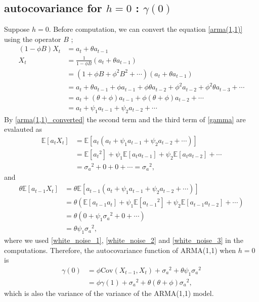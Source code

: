 \documentclass{article}
\newcommand\arma{\ensuremath{\text{ARMA}}}
\newcommand\cov{\ensuremath{\text{Cov}}}
\begin{document}
%
\subsection{autocovariance for \(h=0\) : \(\gamma(0)\)}\label{h0}
Suppose \(h=0\).
Before computation, we can convert the equation \eqref{arma(1,1)} using the operator \(B\) ; 
\begin{equation}\label{arma(1,1)_converted}
\begin{aligned}
(1-\phi B)X_t&=a_t+\theta a_{t-1}\\
X_t&=\frac1{1-\phi B}(a_t+\theta a_{t-1})\\
&=(1+\phi B+\phi^2B^2+\cdots)(a_t+\theta a_{t-1})\\
&=a_t+\theta a_{t-1}+\phi a_{t-1}+\phi\theta a_{t-2}+\phi^2a_{t-2}+\phi^2\theta a_{t-3}+\cdots\\
&=a_t+(\theta+\phi)a_{t-1}+\phi(\theta+\phi)a_{t-2}+\cdots\\
&=a_t+\psi_1a_{t-1}+\psi_2a_{t-2}+\cdots
\end{aligned}
\end{equation}
By \eqref{arma(1,1)_converted} the second term and the third term of \eqref{gamma} are evalauted as
\begin{align*}
\mathbb E[a_tX_t]
&=\mathbb E[a_t(a_t+\psi_1a_{t-1}+\psi_2a_{t-2}+\cdots)]\\
&=\mathbb E[{a_t}^2]+\psi_1\mathbb E[a_ta_{t-1}]+\psi_2\mathbb E[a_ta_{t-2}]+\cdots\\
&={\sigma_a}^2+0+0+\cdots={\sigma_a}^2,
\end{align*}
and
\begin{align*}
\theta\mathbb E[a_{t-1}X_t]
&=\theta\mathbb E[a_{t-1}(a_t+\psi_1a_{t-1}+\psi_2a_{t-2}+\cdots)]\\
&=\theta\left(\mathbb E[a_{t-1}a_t]+\psi_1\mathbb E[{a_{t-1}}^2]+\psi_2\mathbb E[a_{t-1}a_{t-2}]+\cdots\right)\\
&=\theta\left(0+\psi_1{\sigma_a}^2+0+\cdots\right)\\
&=\theta\psi_1{\sigma_a}^2,
\end{align*}
where we used \eqref{white_noise_1}, \eqref{white_noise_2} and \eqref{white_noise_3} in the computations.
Therefore, the autocovariance function of \arma(1,1) when \(h=0\) is
\begin{equation}\label{gamma0}
\begin{aligned}
\gamma(0)
&=\phi\cov(X_{t-1}, X_t)+{\sigma_a}^2+\theta\psi_1{\sigma_a}^2\\
&=\phi\gamma(1)+{\sigma_a}^2+\theta(\theta+\phi){\sigma_a}^2,
\end{aligned}
\end{equation}
which is also the variance of the variance of the \arma(1,1) model.
\end{document}
